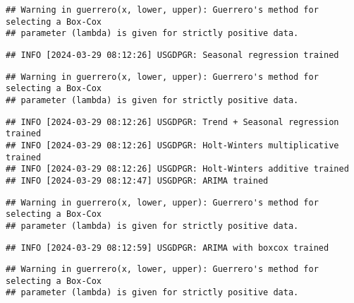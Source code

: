 \documentclass[
]{article}
\begin{document}
\begin{verbatim}
## Warning in guerrero(x, lower, upper): Guerrero's method for selecting a Box-Cox
## parameter (lambda) is given for strictly positive data.
\end{verbatim}

\begin{verbatim}
## INFO [2024-03-29 08:12:26] USGDPGR: Seasonal regression trained
\end{verbatim}

\begin{verbatim}
## Warning in guerrero(x, lower, upper): Guerrero's method for selecting a Box-Cox
## parameter (lambda) is given for strictly positive data.
\end{verbatim}

\begin{verbatim}
## INFO [2024-03-29 08:12:26] USGDPGR: Trend + Seasonal regression trained
## INFO [2024-03-29 08:12:26] USGDPGR: Holt-Winters multiplicative trained
## INFO [2024-03-29 08:12:26] USGDPGR: Holt-Winters additive trained
## INFO [2024-03-29 08:12:47] USGDPGR: ARIMA trained
\end{verbatim}

\begin{verbatim}
## Warning in guerrero(x, lower, upper): Guerrero's method for selecting a Box-Cox
## parameter (lambda) is given for strictly positive data.
\end{verbatim}

\begin{verbatim}
## INFO [2024-03-29 08:12:59] USGDPGR: ARIMA with boxcox trained
\end{verbatim}

\begin{verbatim}
## Warning in guerrero(x, lower, upper): Guerrero's method for selecting a Box-Cox
## parameter (lambda) is given for strictly positive data.
\end{verbatim}
\end{document}
